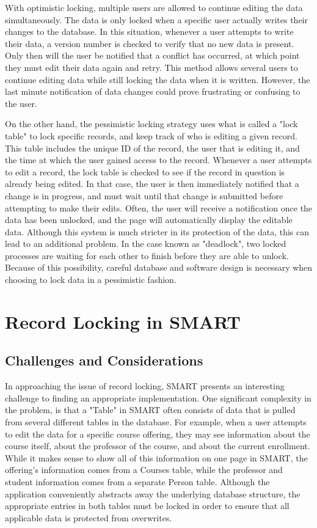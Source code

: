 \documentclass[12pt]{article}
\begin{document}
With optimistic locking, multiple users are allowed to continue editing the data simultaneously. The data is only locked when a specific user actually writes their changes to the database. In this situation, whenever a user attempts to write their data, a version number is checked to verify that no new data is present. Only then will the user be notified that a conflict has occurred, at which point they must edit their data again and retry. This method allows several users to continue editing data while still locking the data when it is written. However, the last minute notification of data changes could prove frustrating or confusing to the user.

On the other hand, the pessimistic locking strategy uses what is called a "lock table" to lock specific records, and keep track of who is editing a given record. This table includes the unique ID of the record, the user that is editing it, and the time at which the user gained access to the record. Whenever a user attempts to edit a record, the lock table is checked to see if the record in question is already being edited. In that case, the user is then immediately notified that a change is in progress, and must wait until that change is submitted before attempting to make their edits. Often, the user will receive a notification once the data has been unlocked, and the page will automatically display the editable data. Although this system is much stricter in its protection of the data, this can lead to an additional problem. In the case known as "deadlock", two locked processes are waiting for each other to finish before they are able to unlock. Because of this possibility, careful database and software design is necessary when choosing to lock data in a pessimistic fashion.

\newpage
\section{Record Locking in SMART}

\subsection{Challenges and Considerations}

In approaching the issue of record locking, SMART presents an interesting challenge to finding an appropriate implementation. One significant complexity in the problem, is that a "Table" in SMART often consists of data that is pulled from several different tables in the database. For example, when a user attempts to edit the data for a specific course offering, they may see information about the course itself, about the professor of the course, and about the current enrollment. While it makes sense to show all of this information on one page in SMART, the offering's information comes from a Courses table, while the professor and student information comes from a separate Person table. Although the application conveniently abstracts away the underlying database structure, the appropriate entries in both tables must be locked in order to ensure that all applicable data is protected from overwrites.
\end{document}
